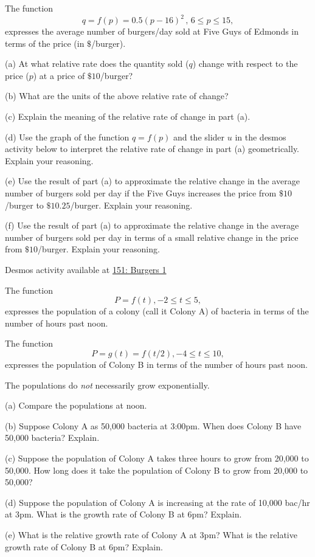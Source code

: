 \documentclass{ximera}
\begin{document}
\begin{question}  \label{Qe5r54tggrgtre}
The function 
\[
    q = f(p) = 0.5(p-16)^2 \, , \, 6\leq p \leq 15 , 
\]
expresses the average number of burgers/day sold at Five Guys of Edmonds in terms of the price (in $\$$/burger).

(a) At what relative rate does the quantity sold ($q$) change with respect to the price ($p$) at a price of $\$10$/burger?

(b) What are the units of the above relative rate of change?

(c) Explain the meaning of the relative rate of change in part (a).

(d) Use the graph of the function $q=f(p)$ and the slider $u$ in the desmos activity below to interpret the relative rate of change in part (a) geometrically. Explain your reasoning.

(e) Use the result of part (a) to approximate the relative change in the average number of burgers sold per day if the Five Guys increases the price from $\$10$/burger to $\$10.25$/burger. Explain your reasoning.

(f) Use the result of part (a) to approximate the relative change in the average number of burgers sold per day in terms of a small relative change in the price from $\$10$/burger. Explain your reasoning.


\begin{onlineOnly}
    \begin{center}
\end{center}
\end{onlineOnly}


Desmos activity available at \href{https://www.desmos.com/calculator/ylgk03oaza}{151: Burgers 1}

\end{question}

\begin{question}  \label{Qdsfsadfghbhhhhyy}
The function
\[
        P = f(t) , -2 \leq t \leq 5,
\]
expresses the population of a colony (call it Colony A) of bacteria in terms of the number of hours past noon.

The function 
\[
          P =g(t) = f(t/2), -4 \leq t \leq 10,
\]
expresses the population of Colony B in terms of the number of hours past noon.

The populations do \emph{not} necessarily grow exponentially.


(a) Compare the populations at noon.


(b) Suppose Colony A as 50,000 bacteria at 3:00pm. When does Colony B have 50,000 bacteria? Explain.

(c) Suppose the population of Colony A takes three hours to grow from 20,000 to 50,000. How long does it take the population of Colony B to grow from 20,000 to 50,000?

(d) Suppose the population of Colony A is increasing at the rate of 10,000 bac/hr at 3pm. What is the growth rate of Colony B at 6pm? Explain. 

(e) What is the relative growth rate of Colony A at 3pm? What is the relative growth rate of Colony B at 6pm? Explain. 

\end{question}
\end{document}
